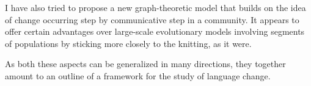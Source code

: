 
I have also tried to propose a new graph-theoretic model that builds on the idea of change occurring step by communicative step in a community. It appears to offer certain advantages over large-scale evolutionary models involving segments of populations by sticking more closely to the knitting, as it were.

As both these aspects can be generalized in many directions, they together amount to an outline of a framework for the study of language change.

